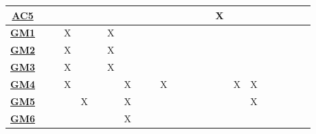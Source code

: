 \documentclass[12pt, titlepage]{article}
\begin{document}
\begin{table}[H]
\begin{adjustwidth}{-1.57in}{-1in}
{\begin{tabular}{c|c|c|c|c|c|c|c|c|c|c|c|c|c|c|c|c|c|c|c|c|c|c|}
\multicolumn{1}{|c|}{\hyperref[Test-AC4]{\textbf{AC5}}}  &              &              &              &              &              &              &              &              &              &              &              &              &              &              &    X         &             &             &        & & & &      \\ \hline
\multicolumn{1}{|c|}{\hyperref[Test-GM1]{\textbf{GM1}}}  &              &              &       X       &              &              &          X    &              &              &              &              &              &              &              &              &             &             &             &        & & & &      \\ \hline
\multicolumn{1}{|c|}{\hyperref[Test-GM2]{\textbf{GM2}}}  &              &              &        X      &              &              &         X    &              &              &              &              &              &              &              &              &             &             &             &       & & & &       \\ \hline
\multicolumn{1}{|c|}{\hyperref[Test-GM3]{\textbf{GM3}}}  &              &              &         X     &              &              &       X      &              &              &              &              &              &              &              &              &             &             &             &       & & & &       \\ \hline
\multicolumn{1}{|c|}{\hyperref[Test-GM4]{\textbf{GM4}}}  &              &              &       X       &              &              &             &    X          &              &              &       X       &              &              &              &              &             &      X       &    X         &       & & & &       \\ \hline
\multicolumn{1}{|c|}{\hyperref[Test-GM5]{\textbf{GM5}}}  &              &              &              &       X       &              &             &     X         &              &              &              &              &              &              &              &             &             &       X      &         & & & &     \\ \hline
\multicolumn{1}{|c|}{\hyperref[Test-GM6]{\textbf{GM6}}} &              &              &              &              &              &             &        X      &              &              &              &              &              &              &              &             &             &             &         & & & &     \\ \hline

\end{tabular}}
\end{adjustwidth}
\end{table}
\end{document}
